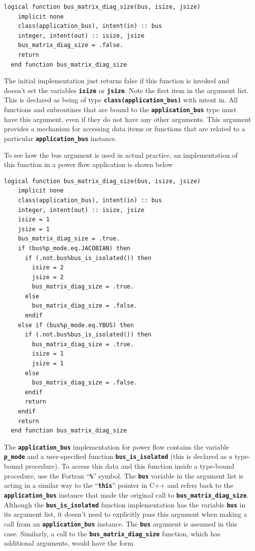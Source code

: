 \documentclass[12pt]{report} %
\begin{document}
{
\color{red}
\begin{Verbatim}[fontseries=b]
  logical function bus_matrix_diag_size(bus, isize, jsize)
    implicit none
    class(application_bus), intent(in) :: bus
    integer, intent(out) :: isize, jsize
    bus_matrix_diag_size = .false.
    return
  end function bus_matrix_diag_size
\end{Verbatim}
}

The initial implementation just returns false if this function is invoked and doesn't set the variables \texttt{\textbf{isize}} or \texttt{\textbf{jsize}}. Note the first item in the argument list. This is declared as being of type \texttt{\textbf{class(application\_bus)}} with intent in. All functions and subroutines that are bound to the \texttt{\textbf{application\_bus}} type must have this argument, even if they do not have any other arguments. This argument provides a mechanism for accessing data items or functions that are related to a particular \texttt{\textbf{application\_bus}} instance.

To see how the bus argument is used in actual practice, an implementation of this function in a power flow application is shown below

{
\color{red}
\begin{Verbatim}[fontseries=b]
  logical function bus_matrix_diag_size(bus, isize, jsize)
    implicit none
    class(application_bus), intent(in) :: bus
    integer, intent(out) :: isize, jsize
    isize = 1
    jsize = 1
    bus_matrix_diag_size = .true.
    if (bus%p_mode.eq.JACOBIAN) then
      if (.not.bus%bus_is_isolated()) then
        isize = 2
        jsize = 2
        bus_matrix_diag_size = .true.
      else
        bus_matrix_diag_size = .false.
      endif
    else if (bus%p_mode.eq.YBUS) then
      if (.not.bus%bus_is_isolated()) then
        bus_matrix_diag_size = .true.
        isize = 1
        jsize = 1
      else
        bus_matrix_diag_size = .false.
      endif
      return
    endif
    return
  end function bus_matrix_diag_size
\end{Verbatim}
}

The \texttt{\textbf{application\_bus}} implementation for power flow contains the variable \texttt{\textbf{p\_mode}} and a user-specified function \texttt{\textbf{bus\_is\_isolated}} (this is declared as a type-bound procedure). To access this data and this function inside a type-bound procedure, use the Fortran ``\texttt{\textbf{\%}}'' symbol. The \texttt{\textbf{bus}} variable in the argument list is acting in a similar way to the ``\texttt{\textbf{this}}'' pointer in C++ and refers back to the \texttt{\textbf{application\_bus}} instance that made the original call to \texttt{\textbf{bus\_matrix\_diag\_size}}. Although the \texttt{\textbf{bus\_is\_isolated}} function implementation has the variable \texttt{\textbf{bus}} in its argument list, it doesn't need to explicitly pass this argument when making a call from an \texttt{\textbf{application\_bus}} instance. The \texttt{\textbf{bus}} argument is assumed in this case. Similarly, a call to the \texttt{\textbf{bus\_matrix\_diag\_size}} function, which has additional arguments, would have the form
\end{document}
